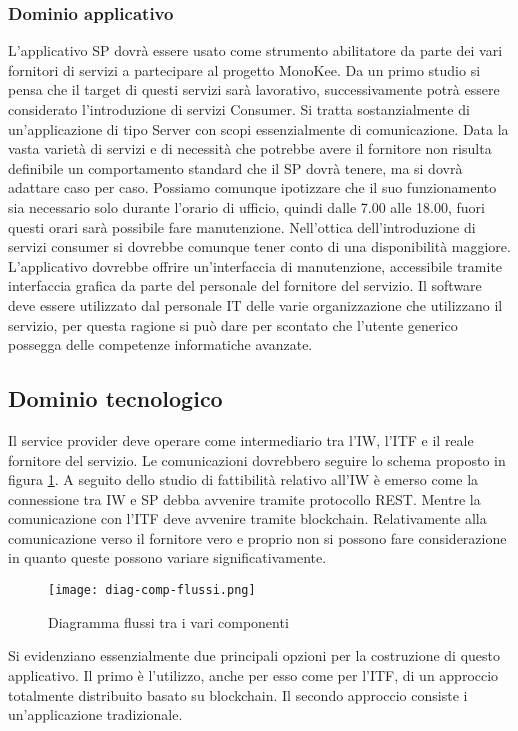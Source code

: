 \subsubsection{Dominio applicativo}
L’applicativo SP dovrà essere usato come strumento abilitatore da parte dei vari fornitori di servizi a partecipare al progetto MonoKee. Da un primo studio si pensa che il target di questi servizi sarà lavorativo, successivamente potrà essere considerato l’introduzione di servizi Consumer. Si tratta sostanzialmente di un’applicazione di tipo Server con scopi essenzialmente di comunicazione. Data la vasta varietà di servizi e di necessità che potrebbe avere il fornitore non risulta definibile un comportamento standard che il SP dovrà tenere, ma si dovrà adattare caso per caso. Possiamo comunque ipotizzare che il suo funzionamento sia necessario solo durante l’orario di ufficio, quindi dalle 7.00 alle 18.00, fuori questi orari sarà possibile fare manutenzione. Nell’ottica dell’introduzione di servizi consumer si dovrebbe comunque tener conto di una disponibilità maggiore. L’applicativo dovrebbe offrire un’interfaccia di manutenzione, accessibile tramite interfaccia grafica da parte del personale del fornitore del servizio. Il software deve essere utilizzato dal personale IT delle varie organizzazione che utilizzano il servizio, per questa ragione si può dare per scontato che l’utente generico possegga delle competenze informatiche avanzate. 
\subsection{Dominio tecnologico}
Il service provider deve operare come intermediario tra l’IW, l’ITF e il reale fornitore del servizio. Le comunicazioni dovrebbero seguire lo schema proposto in figura \ref{fig:diag-flussi}. 
A seguito dello studio di fattibilità relativo all’IW è emerso come la connessione tra IW e SP debba avvenire tramite protocollo REST. Mentre la comunicazione con l’ITF deve avvenire tramite blockchain. Relativamente alla comunicazione verso il fornitore vero e proprio non si possono fare considerazione in quanto queste possono variare significativamente.

\begin{figure}[!h]
    \centering
    \texttt{[image: diag-comp-flussi.png]} 
    \caption{Diagramma flussi tra i vari componenti}
    \label{fig:diag-flussi} 
\end{figure}
Si evidenziano essenzialmente due principali opzioni per la costruzione di questo applicativo. Il primo è l’utilizzo, anche per esso come per l’ITF, di un approccio totalmente distribuito basato su blockchain.  Il secondo approccio consiste i un’applicazione tradizionale.  
